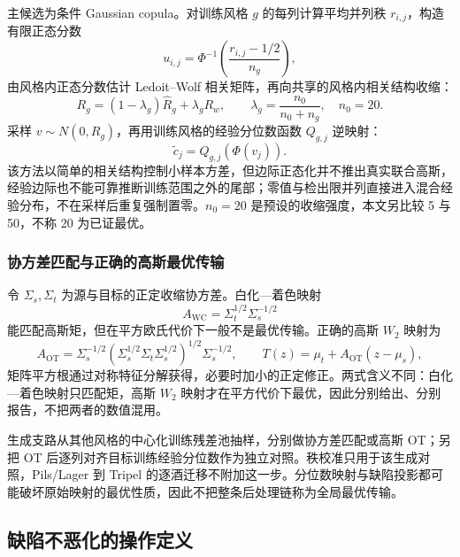 \documentclass[UTF8,a4paper,zihao=-4]{ctexart}
\numberwithin{figure}{section}
\numberwithin{table}{section}
\numberwithin{equation}{section}
\begin{document}
主候选为条件 Gaussian copula。对训练风格 $g$ 的每列计算平均并列秩 $r_{i,j}$，构造有限正态分数
\begin{equation}
u_{i,j}=\Phi^{-1}\left(\frac{r_{i,j}-1/2}{n_g}\right),
\label{eq:normal-score}
\end{equation}
由风格内正态分数估计 Ledoit--Wolf 相关矩阵，再向共享的风格内相关结构收缩：
\begin{equation}
R_g=(1-\lambda_g)\hat R_g+\lambda_g R_w,\qquad \lambda_g=\frac{n_0}{n_0+n_g},\quad n_0=20.
\label{eq:shrinkage}
\end{equation}
采样 $v\sim N(0,R_g)$，再用训练风格的经验分位数函数 $Q_{g,j}$ 逆映射：
\begin{equation}
\tilde c_j=Q_{g,j}\left(\Phi(v_j)\right).
\label{eq:copula}
\end{equation}
该方法以简单的相关结构控制小样本方差，但边际正态化并不推出真实联合高斯，经验边际也不能可靠推断训练范围之外的尾部；零值与检出限并列直接进入混合经验分布，不在采样后重复强制置零。$n_0=20$ 是预设的收缩强度，本文另比较 5 与 50，不称 20 为已证最优。

\subsubsection{协方差匹配与正确的高斯最优传输}

令 $\Sigma_s,\Sigma_t$ 为源与目标的正定收缩协方差。白化—着色映射
\begin{equation}
A_{\mathrm{WC}}=\Sigma_t^{1/2}\Sigma_s^{-1/2}
\label{eq:wc}
\end{equation}
能匹配高斯矩，但在平方欧氏代价下一般不是最优传输。正确的高斯 $W_2$ 映射\cite{peyre2019}为
\begin{equation}
A_{\mathrm{OT}}=\Sigma_s^{-1/2}\left(\Sigma_s^{1/2}\Sigma_t\Sigma_s^{1/2}\right)^{1/2}\Sigma_s^{-1/2},\qquad
T(z)=\mu_t+A_{\mathrm{OT}}\left(z-\mu_s\right),
\label{eq:ot}
\end{equation}
矩阵平方根通过对称特征分解获得，必要时加小的正定修正。两式含义不同：白化—着色映射只匹配矩，高斯 $W_2$ 映射才在平方代价下最优，因此分别给出、分别报告，不把两者的数值混用。

生成支路从其他风格的中心化训练残差池抽样，分别做协方差匹配或高斯 OT；另把 OT 后逐列对齐目标训练经验分位数作为独立对照。秩校准只用于该生成对照，Pils/Lager 到 Tripel 的逐酒迁移不附加这一步。分位数映射与缺陷投影都可能破坏原始映射的最优性质，因此不把整条后处理链称为全局最优传输。

\subsection{缺陷不恶化的操作定义}
\end{document}
